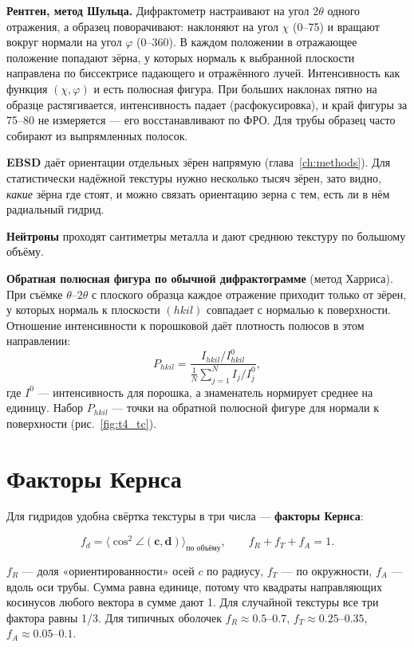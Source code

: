 \textbf{Рентген, метод Шульца.} Дифрактометр настраивают на угол $2\theta$ одного отражения, а образец поворачивают:
наклоняют на угол $\chi$ (0--75\textdegree) и вращают вокруг нормали на угол $\varphi$ (0--360\textdegree). В каждом
положении в отражающее положение попадают зёрна, у которых нормаль к выбранной плоскости направлена по биссектрисе
падающего и отражённого лучей. Интенсивность как функция $(\chi, \varphi)$ и есть полюсная фигура. При больших
наклонах пятно на образце растягивается, интенсивность падает (расфокусировка), и край фигуры за 75--80\textdegree{}
не измеряется --- его восстанавливают по ФРО. Для трубы образец часто собирают из выпрямленных полосок.

\textbf{EBSD} даёт ориентации отдельных зёрен напрямую (глава~\ref{ch:methods}). Для статистически надёжной текстуры
нужно несколько тысяч зёрен, зато видно, \emph{какие} зёрна где стоят, и можно связать ориентацию зерна с тем,
есть ли в нём радиальный гидрид.

\textbf{Нейтроны} проходят сантиметры металла и дают среднюю текстуру по большому объёму.

\textbf{Обратная полюсная фигура по обычной дифрактограмме} (метод Харриса). При съёмке $\theta$--$2\theta$ с плоского
образца каждое отражение приходит только от зёрен, у которых нормаль к плоскости $(hkil)$ совпадает с нормалью к
поверхности. Отношение интенсивности к порошковой даёт плотность полюсов в этом направлении:
\begin{equation}
P_{hkil} = \frac{I_{hkil}/I^0_{hkil}}{\tfrac1N\sum_{j=1}^N I_j/I^0_j},
\end{equation}
где $I^0$ --- интенсивность для порошка, а знаменатель нормирует среднее на единицу. Набор $P_{hkil}$ --- точки на
обратной полюсной фигуре для нормали к поверхности (рис.~\ref{fig:t4_tc}).

\section{Факторы Кернса}

Для гидридов удобна свёртка текстуры в три числа --- \textbf{факторы Кернса}:
\begin{keyf}
\[
f_d = \bigl\langle\cos^2\angle(\mathbf c,\mathbf d)\bigr\rangle_{\text{по объёму}},\qquad f_R+f_T+f_A = 1 .
\]
\end{keyf}
$f_R$ --- доля «ориентированности» осей $c$ по радиусу, $f_T$ --- по окружности, $f_A$ --- вдоль оси трубы. Сумма равна
единице, потому что квадраты направляющих косинусов любого вектора в сумме дают 1. Для случайной текстуры все три
фактора равны 1/3. Для типичных оболочек $f_R\approx0.5$--$0.7$, $f_T\approx0.25$--$0.35$, $f_A\approx0.05$--$0.1$.

